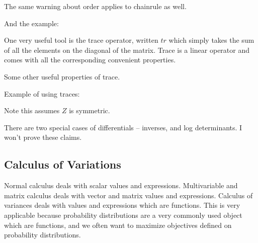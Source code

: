 \documentclass[12pt]{article}
\begin{document}
The same warning about order applies to chainrule as well.

And the example:


One very useful tool is the trace operator, written $tr$ which simply takes the sum of all the elements on the diagonal of the matrix. Trace is a linear operator and comes with all the corresponding convenient properties. 

Some other useful properties of trace.


Example of using traces:


Note this assumes $Z$ is symmetric.

There are two special cases of differentials -- inverses, and log determinants. I won't prove these claims.


\subsection{Calculus of Variations}

Normal calculus deals with scalar values and expressions. Multivariable and matrix calculus deals with vector and matrix values and expressions. Calculus of variances deals with values and expressions which are functions. This is very applicable because probability distributions are a very commonly used object which are functions, and we often want to maximize objectives defined on probability distributions.
\end{document}
